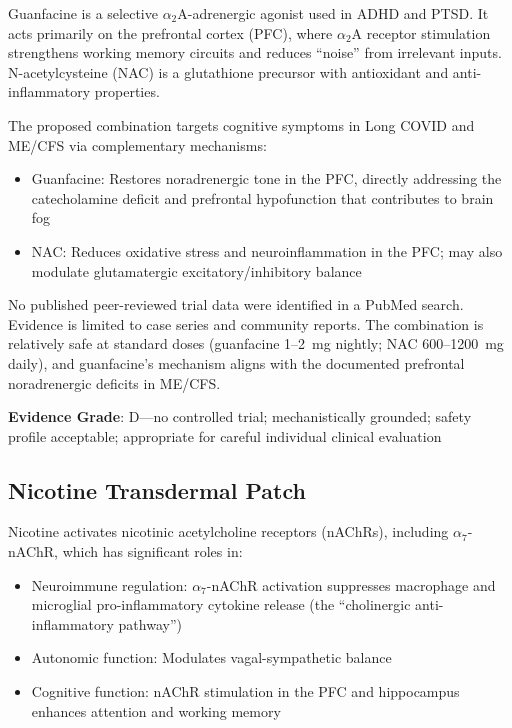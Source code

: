 Guanfacine is a selective $\alpha_2$A-adrenergic agonist used in ADHD and PTSD. It acts primarily on the prefrontal cortex (PFC), where $\alpha_2$A receptor stimulation strengthens working memory circuits and reduces ``noise'' from irrelevant inputs. N-acetylcysteine (NAC) is a glutathione precursor with antioxidant and anti-inflammatory properties.

The proposed combination targets cognitive symptoms in Long COVID and ME/CFS via complementary mechanisms:
\begin{itemize}
    \item Guanfacine: Restores noradrenergic tone in the PFC, directly addressing the catecholamine deficit and prefrontal hypofunction that contributes to brain fog
    \item NAC: Reduces oxidative stress and neuroinflammation in the PFC; may also modulate glutamatergic excitatory/inhibitory balance
\end{itemize}

No published peer-reviewed trial data were identified in a PubMed search. Evidence is limited to case series and community reports. The combination is relatively safe at standard doses (guanfacine 1--2~mg nightly; NAC 600--1200~mg daily), and guanfacine's mechanism aligns with the documented prefrontal noradrenergic deficits in ME/CFS.

\textbf{Evidence Grade}: D---no controlled trial; mechanistically grounded; safety profile acceptable; appropriate for careful individual clinical evaluation

\subsection{Nicotine Transdermal Patch}
\label{subsec:nicotine-patch}

Nicotine activates nicotinic acetylcholine receptors (nAChRs), including $\alpha_7$-nAChR, which has significant roles in:
\begin{itemize}
    \item Neuroimmune regulation: $\alpha_7$-nAChR activation suppresses macrophage and microglial pro-inflammatory cytokine release (the ``cholinergic anti-inflammatory pathway'')
    \item Autonomic function: Modulates vagal-sympathetic balance
    \item Cognitive function: nAChR stimulation in the PFC and hippocampus enhances attention and working memory
\end{itemize}

